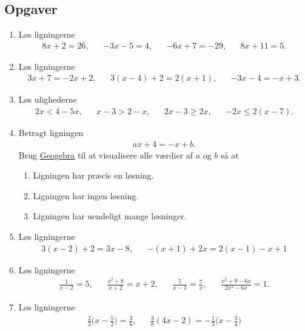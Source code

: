 \subsection{Opgaver}

\begin{enumerate}
\item Løs ligningerne
\begin{align*}
8x+2=26,&& -3x-5=4,&&-6x+7=-29,&& 8x+11=5.
\end{align*}

\item Løs ligningerne
\begin{align*}
3x+7=-2x+2,&& 3(x-4)+2=2(x+1),&& -3x-4=-x+3.
\end{align*}

\item Løs ulighederne 
\begin{align*}
2x<4-5x,&& x-3>2-x,&& 2x-3\geq 2x,&& -2x\leq2(x-7).
\end{align*}

\item Betragt ligningen
\begin{align*}
ax+4=-x+b.
\end{align*}
Brug \href{https://www.geogebra.org/m/Q4Wh3Xrj}{Geogebra} til at visualisere alle værdier af $a$ og $b$ så at
\begin{enumerate}
\item Ligningen har præcis en løsning.
\item Ligningen har ingen løsning.
\item Ligningen har uendeligt mange løsninger.
\end{enumerate}

\item Løs ligningerne
\begin{align*}
 3(x-2)+2=3x-8,&& -(x+1)+2x=2(x-1)-x+1
\end{align*}

\item Løs ligningerne 
\begin{align*}
\frac{1}{x-2}=5,&& \frac{x^2+8}{x+2}=x+2,&& \frac{5}{x-1}=\frac{7}{x},&&  \frac{x^2+9-6x}{2x^2-6x}=1.
\end{align*}

\item Løs ligningerne
\begin{align*}
\frac{2}{3}\Big(x- \frac{5}{2}\Big)=\frac{3}{6},&& \frac{3}{8}(4x-2)=-\frac{1}{3}\Big(x-\frac{3}{4}\Big)
\end{align*}


\end{enumerate}
